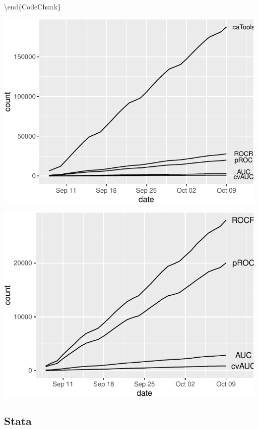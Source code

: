 \documentclass[article]{jss}
\begin{document}
\textbackslash{}end\{CodeChunk\}

\begin{CodeChunk}


\begin{center}\includegraphics{index_files/figure-latex/unnamed-chunk-15-1} \end{center}



\begin{center}\includegraphics{index_files/figure-latex/unnamed-chunk-15-2} \end{center}

\end{CodeChunk}

\hypertarget{stata}{%
\subsection{Stata}\label{stata}}
\end{document}
